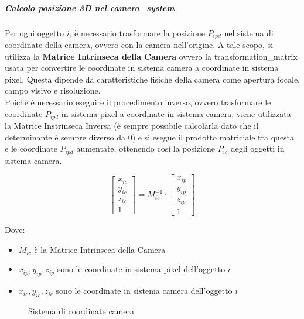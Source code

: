 \subparagraph{Calcolo posizione 3D nel \gls{camera_system}}
Per ogni oggetto $i$, è necessario trasformare la posizione $P_{ipd}$ nel sistema di coordinate della camera, ovvero con la camera nell'origine. A tale scopo, si utilizza la \textbf{Matrice Intrinseca della Camera} ovvero la \gls{transformation_matrix} usata per convertire le coordinate in sistema camera a coordinate in sistema pixel. Questa dipende da caratteristiche fisiche della camera come apertura focale, campo visivo e risoluzione.\\
Poichè è necessario eseguire il procedimento inverso, ovvero trasformare le coordinate $P_{ipd}$ in sistema pixel a coordinate in sistema camera, viene utilizzata la Matrice Instrinseca Inversa (è sempre possibile calcolarla dato che il determinante è sempre diverso da 0) e si esegue il prodotto matriciale tra questa e le coordinate $P_{ipd}$ aumentate, ottenendo così la posizione $P_{ic}$ degli oggetti in sistema camera.

\[
  \begin{bmatrix}
    x_{ic} \\
    y_{ic} \\
    z_{ic} \\
    1
  \end{bmatrix}
  =
  M_{ic}^{-1}
  \cdot
  \begin{bmatrix}
    x_{ip} \\
    y_{ip} \\
    z_{ip} \\
    1
  \end{bmatrix}
\]

Dove:
\begin{itemize}
  \item $M_{ic}$ è la Matrice Intrinseca della Camera
  \item $x_{ip}, y_{ip}, z_{ip}$ sono le coordinate in sistema pixel dell'oggetto $i$
  \item $x_{ic}, y_{ic}, z_{ic}$ sono le coordinate in sistema camera dell'oggetto $i$
\end{itemize}

\begin{figure}[h]
  \centering
  \caption{Sistema di coordinate camera}
\end{figure}

